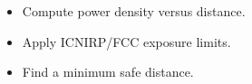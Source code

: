 \begin{objectives}
\begin{itemize}[leftmargin=1.4em,itemsep=2pt]
\item Compute power density versus distance.
\item Apply ICNIRP/FCC exposure limits.
\item Find a minimum safe distance.
\end{itemize}
\end{objectives}
